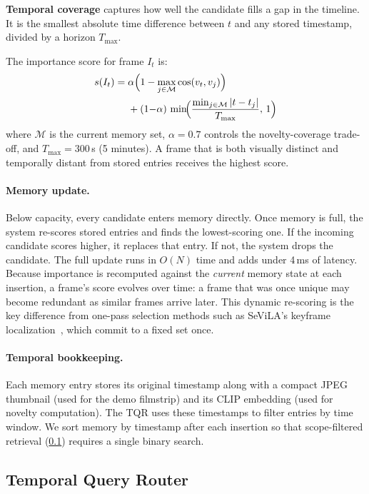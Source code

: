 \textbf{Temporal coverage} captures how well the candidate fills a gap in the timeline. It is the smallest absolute time difference between $t$ and any stored timestamp, divided by a horizon $T_{\max}$.

The importance score for frame $I_t$ is:
\begin{equation}
\begin{split}
  s(I_t) =\; & \alpha \Bigl(1 - \max_{j \in \mathcal{M}} \cos(v_t, v_j)\Bigr) \\
  & + (1{-}\alpha)\,\min\!\Bigl(\frac{\min_{j \in \mathcal{M}} |t - t_j|}{T_{\max}},\, 1\Bigr)
\end{split}
  \label{eq:importance}
\end{equation}
where $\mathcal{M}$ is the current memory set, $\alpha = 0.7$ controls the novelty-coverage trade-off, and $T_{\max} = 300$\,s (5 minutes). A frame that is both visually distinct and temporally distant from stored entries receives the highest score.

\paragraph{Memory update.}
Below capacity, every candidate enters memory directly.
Once memory is full, the system re-scores stored entries and finds the lowest-scoring one. If the incoming candidate scores higher, it replaces that entry. If not, the system drops the candidate. The full update runs in $O(N)$ time and adds under 4\,ms of latency.
Because importance is recomputed against the \emph{current} memory state at each insertion, a frame's score evolves over time: a frame that was once unique may become redundant as similar frames arrive later.
This dynamic re-scoring is the key difference from one-pass selection methods such as SeViLA's keyframe localization~\cite{yu2023sevila}, which commit to a fixed set once.

\paragraph{Temporal bookkeeping.}
Each memory entry stores its original timestamp along with a compact JPEG thumbnail (used for the demo filmstrip) and its CLIP embedding (used for novelty computation). The TQR uses these timestamps to filter entries by time window. We sort memory by timestamp after each insertion so that scope-filtered retrieval (\cref{sec:tqr}) requires a single binary search.


\subsection{Temporal Query Router}
\label{sec:tqr}

